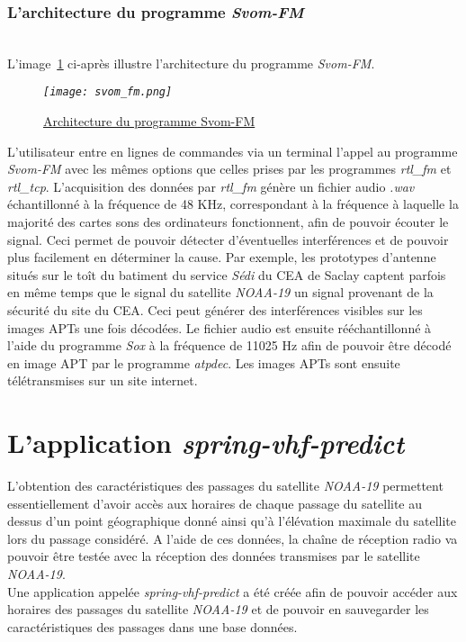 \documentclass[12pt,fleqn]{book} %
\begin{document}
\subsection{L'architecture du programme \emph{Svom-FM}}
~\\\indent L'image~\underline{\color{blue}\ref{svom_fm}} ci-après illustre l'architecture du programme \emph{Svom-FM}.
\begin{figure}[H]
	\centering
	\itshape
	\texttt{[image: svom\_fm.png]}
	\caption{\label{svom_fm} \underline{Architecture du programme Svom-FM}}
\end{figure}
L'utilisateur entre en lignes de commandes via un terminal l'appel au programme \emph{Svom-FM} avec les mêmes options que celles prises par les programmes \emph{rtl\_fm} et \emph{rtl\_tcp}. L'acquisition des données par \emph{rtl\_fm} génère un fichier audio \emph{.wav} échantillonné à la fréquence de 48 KHz, correspondant à la fréquence à laquelle la majorité des cartes sons des ordinateurs fonctionnent, afin de pouvoir écouter le signal. Ceci permet de pouvoir détecter d'éventuelles interférences et de pouvoir plus facilement en déterminer la cause. Par exemple, les prototypes d'antenne situés sur le toît du batiment du service \emph{Sédi} du CEA de Saclay captent parfois en même temps que le signal du satellite \emph{NOAA-19} un signal provenant de la sécurité du site du CEA. Ceci peut générer des interférences visibles sur les images APTs une fois décodées.
Le fichier audio est ensuite rééchantillonné à l'aide du programme \emph{Sox} à la fréquence de 11025 Hz afin de pouvoir être décodé en image APT par le programme \emph{atpdec}. Les images APTs sont ensuite télétransmises sur un site internet.
\chapter{L'application \emph{spring-vhf-predict}}
L'obtention des caractéristiques des passages du satellite \emph{NOAA-19} permettent essentiellement d'avoir accès aux horaires de chaque passage du satellite au dessus d'un point géographique donné ainsi qu'à l'élévation maximale du satellite lors du passage considéré. A l'aide de ces données, la chaîne de réception radio va pouvoir être testée avec la réception des données transmises par le satellite \emph{NOAA-19}.
~\\ Une application appelée \emph{spring-vhf-predict} a été créée afin de pouvoir accéder aux horaires des passages du satellite \emph{NOAA-19} et de pouvoir en sauvegarder les caractéristiques des passages dans une base données.
\end{document}
